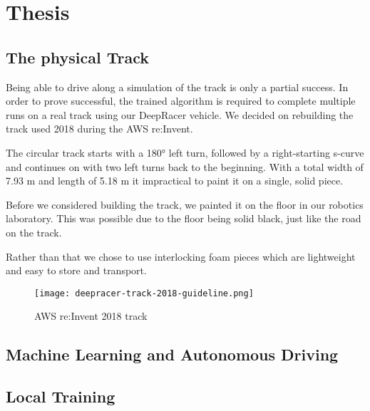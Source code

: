 \chapter{Thesis}
\label{cha:Diplomschrift}

\section{The physical Track}

Being able to drive along a simulation of the track is only a partial success. In order to prove successful, the trained algorithm is required to complete multiple runs on a real track using our DeepRacer vehicle. We decided on rebuilding the track used 2018 during the AWS re:Invent.

The circular track starts with a 180° left turn, followed by a right-starting s-curve and continues on with two left turns back to the beginning. With a total width of 7.93 m and length of 5.18 m it impractical to paint it on a single, solid piece.

Before we considered building the track, we painted it on the floor in our robotics laboratory. This was possible due to the floor being solid black, just like the road on the track.

Rather than that we chose to use interlocking foam pieces which are lightweight and easy to store and transport.

\begin{figure}
    \centering
    \texttt{[image: deepracer-track-2018-guideline.png]}
    \caption{AWS re:Invent 2018 track}
    \label{fig:track}
\end{figure}

\section{Machine Learning and Autonomous Driving}


 \section{Local Training}
 
